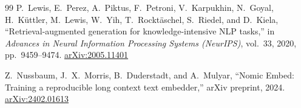 \begin{thebibliography}{99}
P.~Lewis, E.~Perez, A.~Piktus, F.~Petroni, V.~Karpukhin, N.~Goyal, H.~K\"uttler, M.~Lewis, W.~Yih, T.~Rockt\"aschel, S.~Riedel, and D.~Kiela, ``Retrieval-augmented generation for knowledge-intensive NLP tasks,'' in \emph{Advances in Neural Information Processing Systems (NeurIPS)}, vol.~33, 2020, pp.~9459--9474. \href{https://arxiv.org/abs/2005.11401}{arXiv:2005.11401}

Z.~Nussbaum, J.~X.~Morris, B.~Duderstadt, and A.~Mulyar, ``Nomic Embed: Training a reproducible long context text embedder,'' arXiv preprint, 2024. \href{https://arxiv.org/abs/2402.01613}{arXiv:2402.01613}

\end{thebibliography}
